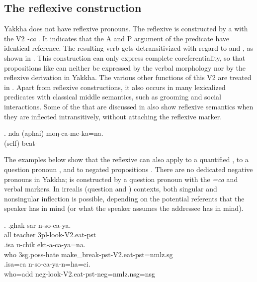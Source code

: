 \subsection{The reflexive construction}\label{refl}

Yakkha does not have reflexive pronouns. The reflexive is constructed by a  with the V2 \emph{-ca} . It indicates that the A and P argument of the predicate have identical reference.  The resulting verb gets detransitivized with regard to  and , as shown in \Next. This construction can only express complete coreferentiality, so that propositions like  can neither be expressed by the verbal morphology nor by the reflexive derivation  in Yakkha.
The various other functions of this V2 are treated in . Apart from reflexive constructions, it also occurs in many lexicalized predicates with classical middle semantics, such as grooming and social interactions. Some of the  that are discussed in  also show reflexive semantics when they are inflected intransitively, without attaching the reflexive marker. 

\exg. nda (aphai) moŋ-ca-me-ka=na.\\
 (self) beat-\\
 
The examples below show that the reflexive can also apply to a quantified  \Next[a], to a question pronoun \Next[b], and to negated propositions \Next[c]. There are no dedicated negative pronouns in Yakkha;  is constructed by a question pronoun with the   \emph{=ca} and verbal  markers. In irrealis (question and ) contexts, both singular and nonsingular inflection is possible, depending on the potential referents that the speaker has in mind (or what the speaker assumes the addressee has in mind).

\ex. \ag.ghak sar n-so-ca-ya.\\
		all teacher {\sc 3pl}-look-{\sc V2.eat-pst}\\
 	\bg.\label{uchik}isa u-chik ekt-a-ca-ya=na.\\
	who {\sc 3sg.poss}-hate make\_break{\sc [3sg]-pst-V2.eat-pst=nmlz.sg}\\
	 \bg.isa=ca n-so-ca-ya-n=ha=ci.\\
	who{\sc =add}  {\sc neg}-look-{\sc V2.eat-pst-neg=nmlz.nsg=nsg}\\


